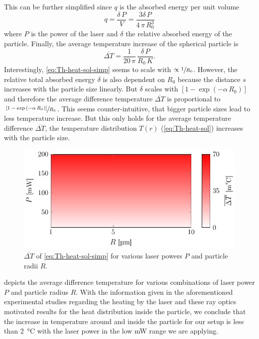 This can be further simplified since $q$ is the absorbed energy per unit volume
\begin{equation}
  q = \frac{\delta\,P}{V} = \frac{3\delta\,P}{4\,\pi\,R_{0}^{3}}
\end{equation}
where $P$ is the power of the laser and $\delta$ the relative absorbed energy 
of the particle. Finally, the average temperature increase of the spherical 
particle is
\begin{equation}
  \overline{\Delta T} = \frac{1}{20\,\pi}\,\frac{\delta\,P}{R_{0}\,K}.
  \label{eq:Th-heat-sol-simp}
\end{equation}
Interestingly, \cref{eq:Th-heat-sol-simp} seems to scale with $\propto 
\sfrac{1}{R_{0}}$. However, the relative total absorbed energy $\delta$ is also 
dependent on $R_{0}$ because the distance $s$ increases with the particle size 
linearly. But $\delta$ scales with $\left[  1-\exp\left( -\alpha\,R_{0} 
\right)\right]$ and therefore the average difference temperature 
$\overline{\Delta T}$ is proportional to $\sfrac{\left[ 1-\exp\left( 
-\alpha\,R_{0} \right) \right]}{R_{0}}$. This seems counter-intuitive, that 
bigger particle sizes lead to less temperature increase. But this only holds 
for the average temperature difference $\overline{\Delta T}$, the temperature 
distribution $T(r)$ (\cref{eq:Th-heat-sol}) increases with the particle size.

\begin{figure}[tbp]
  \centering
  \includegraphics[]{Plots/cache/dT.pdf}
  \caption{$\overline{\Delta T}$ of \cref{eq:Th-heat-sol-simp} for various 
  laser powers $P$ and particle radii $R$.}
  \label{fig:Th-dT}
\end{figure}

 depicts the average difference temperature for various 
combinations of laser power $P$ and particle radius $R$. With the information 
given in the aforementioned experimental studies regarding the heating by the 
laser and these ray optics motivated results for the heat distribution inside 
the particle, we conclude that the increase in temperature around and inside 
the particle for our setup is less than \SI{2}{\degreeCelsius} with the laser 
power in the low \si{\milli\watt} range we are applying.

